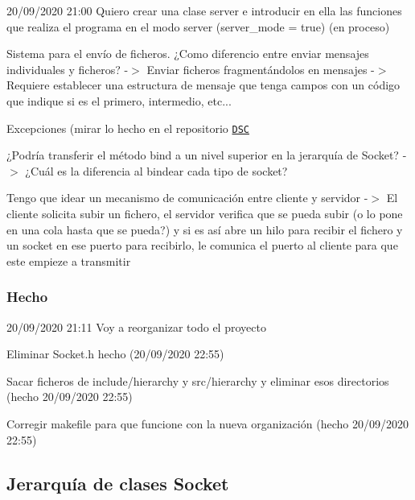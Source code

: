 \begin{DoxyItemize}
\item 20/09/2020 21\+:00 Quiero crear una clase server e introducir en ella las funciones que realiza el programa en el modo server (server\+\_\+mode = true) (en proceso)
\item Sistema para el envío de ficheros. ¿\+Como diferencio entre enviar mensajes individuales y ficheros? -\/$>$ Enviar ficheros fragmentándolos en mensajes -\/$>$ Requiere establecer una estructura de mensaje que tenga campos con un código que indique si es el primero, intermedio, etc...
\item Excepciones (mirar lo hecho en el repositorio \href{https://github.com/miguel-martinr/Data-Structure-Classes}{\tt D\+SC}
\item ¿\+Podría transferir el método bind a un nivel superior en la jerarquía de Socket? -\/$>$ ¿\+Cuál es la diferencia al bindear cada tipo de socket?
\item Tengo que idear un mecanismo de comunicación entre cliente y servidor -\/$>$ El cliente solicita subir un fichero, el servidor verifica que se pueda subir (o lo pone en una cola hasta que se pueda?) y si es así abre un hilo para recibir el fichero y un socket en ese puerto para recibirlo, le comunica el puerto al cliente para que este empieze a transmitir
\end{DoxyItemize}

\subsubsection*{Hecho}


\begin{DoxyItemize}
\item 20/09/2020 21\+:11 Voy a reorganizar todo el proyecto
\begin{DoxyItemize}
\item Eliminar Socket.\+h hecho (20/09/2020 22\+:55)
\item Sacar ficheros de include/hierarchy y src/hierarchy y eliminar esos directorios (hecho 20/09/2020 22\+:55)
\item Corregir makefile para que funcione con la nueva organización (hecho 20/09/2020 22\+:55)
\end{DoxyItemize}
\end{DoxyItemize}

\subsection*{Jerarquía de clases Socket}


